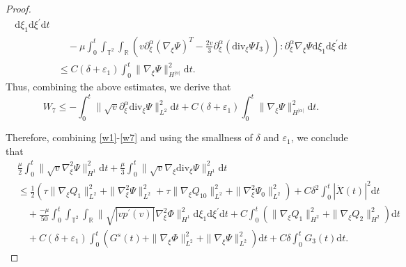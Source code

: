 \documentclass[10pt,reqno]{amsart}
\numberwithin{equation}{section}
\newcommand{\dif}{\mathrm{d}}
\newcommand{\ddiv}{\mathrm{div}}
\begin{document}
\begin{proof}
\begin{align*}
		\dif \xi_1\dif \xi^{\prime}\dif t\\
		&\quad-\mu\int_0^t\int_{\mathbb{T}^2}\int_{\mathbb{R}}
		\left(v\partial_\xi^\alpha\left(\nabla_\xi\Psi\right)^T
		-\frac{2v}{3}\partial_\xi^\alpha\left(\ddiv_\xi\Psi I_3\right)\right):\partial_\xi^\alpha\nabla_\xi\Psi
		\dif \xi_1\dif \xi^{\prime}\dif t\\
		&\le
		C(\delta+\varepsilon_1)
		\int_0^t \|\nabla_\xi\Psi\|^2_{H^{|\alpha|}}
		\dif t.
	\end{align*}
Thus, combining the above estimates, we derive that
\begin{equation}\label{w7}
W_7\le -\int_0^t
\|\sqrt{v} \partial_\xi^\alpha\ddiv_\xi\Psi\|_{L^2}^2
\dif t+C(\delta+\varepsilon_1)
\int_0^t \|\nabla_\xi\Psi\|^2_{H^{|\alpha|}}
\dif t.
\end{equation}

Therefore, combining \eqref{w1}-\eqref{w7} and using the smallness of $\delta$ and $\varepsilon_1$, we conclude that
\begin{equation}\label{gjhsgj4}
\begin{aligned}
&\frac{\mu}{2}\int_0^t\|\sqrt{v}\nabla^2_\xi\Psi\|_{H^1}^2\dif t
+\frac{\mu}{3}\int_0^t\|
\sqrt{v}\nabla_\xi\ddiv_\xi\Psi\|_{H^1}^2
\dif t\\
&\le
\frac{1}{2}\left(\tau\|\nabla_\xi Q_{1}\|_{L^2}^2+\|\nabla^2_\xi\Psi\|_{L^2}^2
+\tau\|\nabla_\xi Q_{10}\|_{L^2}^2+\|\nabla^2_\xi\Psi_0\|_{L^2}^2\right)
+C\delta^2\int_0^t|\dot X(t)|^2\dif t\\
&\quad
+\frac{-\mu}{50}\int_0^t\int_{\mathbb{T}^2}\int_{\mathbb{R}}\|\sqrt{|vp^\prime(v)|}\nabla^2_\xi\Phi\|_{H^1}^2\dif \xi_1\dif \xi^{\prime}\dif t
+C\int_0^t\left(\|\nabla_\xi Q_1\|_{H^{2}}^2+\|\nabla_\xi Q_2\|_{H^{2}}^2\right)\dif t\\
&\quad+C(\delta+\varepsilon_1)\int_0^t\left(G^s(t)+\|\nabla_\xi \Phi\|_{L^2}^2+\|\nabla_\xi \Psi\|_{L^2}^2\right)\dif t
+C\delta\int_0^tG_3(t)\dif t.
\end{aligned}
\end{equation}


\end{proof}
\end{document}
